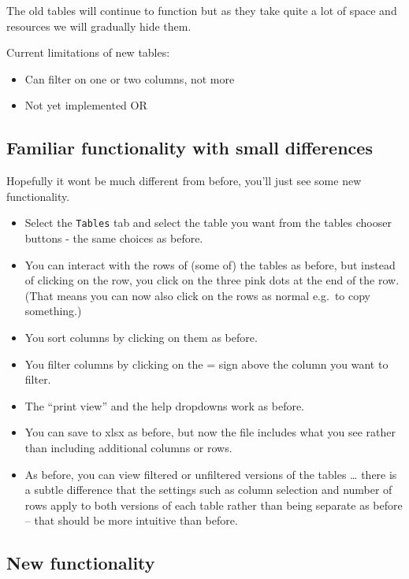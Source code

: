 \documentclass[
]{book}
\providecommand{\tightlist}{%
  \setlength{\itemsep}{0pt}\setlength{\parskip}{0pt}}
\begin{document}
The old tables will continue to function but as they take quite a lot of space and resources we will gradually hide them.

Current limitations of new tables:

\begin{itemize}
\tightlist
\item
  Can filter on one or two columns, not more
\item
  Not yet implemented OR
\end{itemize}

\hypertarget{familiar-functionality-with-small-differences}{%
\subsection{Familiar functionality with small differences}\label{familiar-functionality-with-small-differences}}

Hopefully it wont be much different from before, you'll just see some new functionality.

\begin{itemize}
\item
  Select the \texttt{Tables} tab and select the table you want from the tables chooser buttons - the same choices as before.
\item
  You can interact with the rows of (some of) the tables as before, but instead of clicking on the row, you click on the three pink dots at the end of the row. (That means you can now also click on the rows as normal e.g.~to copy something.)
\item
  You sort columns by clicking on them as before.
\item
  You filter columns by clicking on the = sign above the column you want to filter.
\item
  The ``print view'' and the help dropdowns work as before.
\item
  You can save to xlsx as before, but now the file includes what you see rather than including additional columns or rows.
\item
  As before, you can view filtered or unfiltered versions of the tables \ldots{} there is a subtle difference that the settings such as column selection and number of rows apply to both versions of each table rather than being separate as before -- that should be more intuitive than before.
\end{itemize}

\hypertarget{new-functionality}{%
\subsection{New functionality}\label{new-functionality}}
\end{document}
